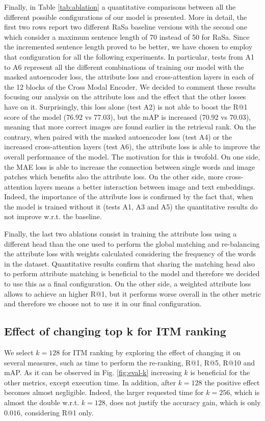 \documentclass[acmsmall]{acmart}
\newcommand{\anote}[1]{\textcolor{red}{AP: #1}}
\begin{document}
Finally, in Table \ref{tab:ablation} a quantitative comparisons between all the different possible configurations of our model is presented. More in detail, the first two rows report two different RaSa \cite{bai2023rasa} baseline versions with the second one which consider a maximum sentence length of 70 instead of 50 for RaSa. Since the incremented sentence length proved to be better, we have chosen to employ that configuration for all the following experiments. In particular, tests from A1 to A6 represent all the different combinations of training our model with the masked autoencoder loss, the attribute loss and cross-attention layers in each of the 12 blocks of the Cross Modal Encoder. We decided to comment these results focusing our analysis on the attribute loss and the effect that the other losses have on it. %
Surprisingly, this loss alone (test A2) is not able to boost the R@1 score of the model (76.92 vs 77.03), but the mAP is increased (70.92 vs 70.03), meaning that more correct images are found earlier in the retrieval rank. On the contrary, when paired with the masked autoencoder loss (test A4) or the increased cross-attention layers (test A6), the attribute loss is able to improve the overall performance of the model. The motivation for this is twofold. On one side, the MAE loss is able to increase the connection between single words and image patches which benefits also the attribute loss. On the other side, more cross-attention layers means a better interaction between image and text embeddings. Indeed, the importance of the attribute loss is confirmed by the fact that, when the model is trained without it (tests A1, A3 and A5) the quantitative results do not improve w.r.t. the baseline. 

Finally, the last two ablations consist in training the attribute loss using a different head than the one used to perform the global matching and re-balancing the attribute loss with weights calculated considering the frequency of the words in the dataset. Quantitative results confirm that sharing the matching head also to perform attribute matching is beneficial to the model and therefore we decided to use this as a final configuration. On the other side, a weighted attribute loss allows to achieve an higher R@1, but it performs worse overall in the other metric and therefore we choose not to use it in our final configuration.

\subsection{Effect of changing top k for ITM ranking}\label{sec:top-k}
We select $k=128$ for ITM ranking by exploring the effect of changing it on several measures, such as time to perform the re-ranking, R@1, R@5, R@10 and mAP. As it can be observed in Fig. \ref{fig:eval-k} increasing $k$ is beneficial for the other metrics, except execution time. In addition, after $k=128$ the positive effect becomes almost negligible. Indeed, the larger requested time for $k=256$, which is almost the double w.r.t. $k=128$, does not justify the accuracy gain, which is only $0.016$, considering R@1 only.
\end{document}

